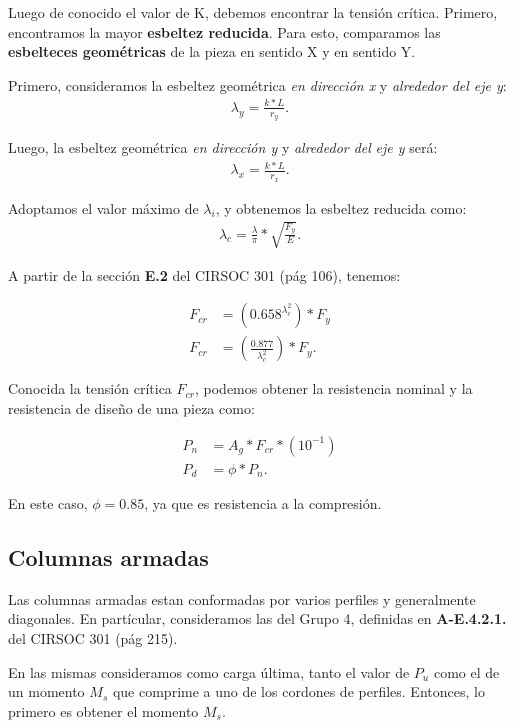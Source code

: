 \documentclass[../main.tex]{subfiles}
\begin{document}
Luego de conocido el valor de K, debemos encontrar la tensión crítica. Primero,
encontramos la mayor \textbf{esbeltez reducida}. Para esto, comparamos las
\textbf{esbelteces geométricas} de la pieza en sentido X y en sentido Y.

Primero, consideramos la esbeltez geométrica \textit{en dirección x} y
\textit{alrededor del eje y}:
\begin{align*}
  \lambda_y = \frac{k*L}{r_y}
.\end{align*}

Luego, la esbeltez geométrica \textit{en dirección y} y \textit{alrededor del}
\textit{eje y} será:
\begin{align*}
  \lambda_x = \frac{k*L}{r_x}
.\end{align*}

Adoptamos el valor máximo de $\lambda_i$, y obtenemos la esbeltez reducida como:
\begin{align*}
  \lambda_c = \frac{\lambda}{\pi} * \sqrt{\frac{F_y}{E}}  
.\end{align*}

A partir de la sección \textbf{E.2} del CIRSOC 301 (pág 106), tenemos:

\begin{align*}
  F_{cr} &= \left( 0.658^{\lambda_c^2} \right)*F_y \tag{$\lambda_c \leq 1.5$}  \\[5pt]
  F_{cr} &= \left( \frac{0.877}{\lambda_c^2} \right) * F_y \tag{$\lambda_c \geq 1.5$}
.\end{align*}

Conocida la tensión crítica $F_{cr}$, podemos obtener la resistencia nominal y 
la resistencia de diseño de una pieza como:

\begin{align*}
  P_{n} &= A_g * F_{cr} * (10^{-1}) \\[5pt]
  P_{d} &= \phi * P_n
.\end{align*}

En este caso, $\phi=0.85$, ya que es resistencia a la compresión.

\subsection{Columnas armadas}

Las columnas armadas estan conformadas por varios perfiles y generalmente
diagonales. En partícular, consideramos las del Grupo 4, definidas en 
\textbf{A-E.4.2.1.} del CIRSOC 301 (pág 215).

En las mismas consideramos como carga última, tanto el valor de $P_u$ como el de
un momento $M_s$ que comprime a uno de los cordones de perfiles. Entonces, lo
primero es obtener el momento $M_s$.
\end{document}
